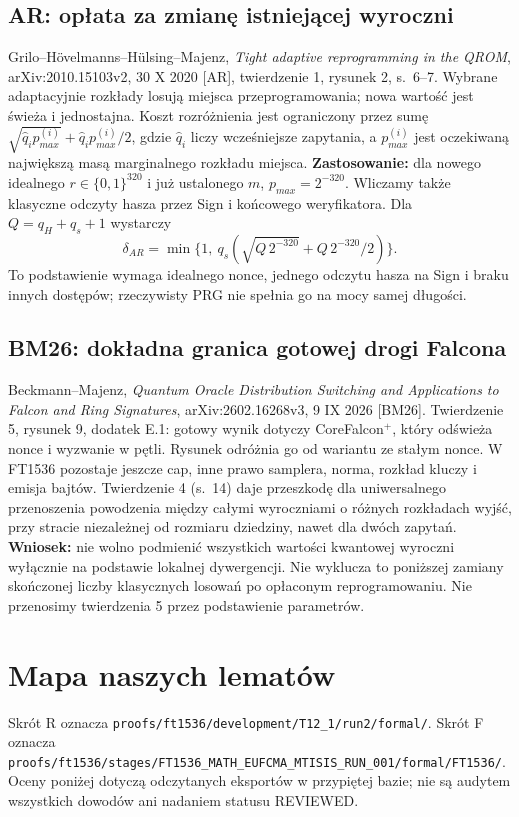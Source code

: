 \documentclass[11pt,a4paper]{article}
\newcommand{\code}[1]{\nolinkurl{#1}}
\begin{document}
\subsection*{AR: opłata za zmianę istniejącej wyroczni}
Grilo--Hövelmanns--Hülsing--Majenz, \emph{Tight adaptive reprogramming
in the QROM}, arXiv:2010.15103v2, 30 X 2020 [AR], twierdzenie 1,
rysunek 2, s.~6--7. Wybrane adaptacyjnie rozkłady losują miejsca
przeprogramowania; nowa wartość jest świeża i jednostajna. Koszt rozróżnienia
jest ograniczony przez sumę
$\sqrt{\widehat q_i p^{(i)}_{max}}+\widehat q_i p^{(i)}_{max}/2$,
gdzie $\widehat q_i$ liczy wcześniejsze zapytania, a $p^{(i)}_{max}$ jest
oczekiwaną największą masą marginalnego rozkładu miejsca.
\textbf{Zastosowanie:} dla nowego idealnego $r\in\{0,1\}^{320}$ i już
ustalonego $m$, $p_{max}=2^{-320}$. Wliczamy także klasyczne odczyty hasza
przez Sign i końcowego weryfikatora. Dla $Q=q_H+q_s+1$ wystarczy
\[
 \delta_{AR}=\min\{1,\ q_s(\sqrt{Q\,2^{-320}}+Q\,2^{-320}/2)\}.
\]
To podstawienie wymaga idealnego nonce, jednego odczytu hasza na Sign
i braku innych dostępów; rzeczywisty PRG nie spełnia go na mocy samej długości.

\subsection*{BM26: dokładna granica gotowej drogi Falcona}
Beckmann--Majenz, \emph{Quantum Oracle Distribution Switching and
Applications to Falcon and Ring Signatures}, arXiv:2602.16268v3,
9 IX 2026 [BM26]. Twierdzenie 5, rysunek 9, dodatek E.1:
gotowy wynik dotyczy CoreFalcon$^+$, który odświeża nonce i wyzwanie w pętli.
Rysunek odróżnia go od wariantu ze stałym nonce. W FT1536 pozostaje jeszcze
cap, inne prawo samplera, norma, rozkład kluczy i emisja bajtów.
Twierdzenie 4 (s.~14) daje przeszkodę dla uniwersalnego przenoszenia
powodzenia między całymi wyroczniami o różnych rozkładach wyjść,
przy stracie niezależnej od rozmiaru dziedziny, nawet dla dwóch zapytań.
\textbf{Wniosek:} nie wolno podmienić wszystkich wartości kwantowej
wyroczni wyłącznie na podstawie lokalnej dywergencji. Nie wyklucza to
poniższej zamiany skończonej liczby klasycznych losowań po opłaconym
reprogramowaniu. Nie przenosimy twierdzenia 5 przez podstawienie parametrów.

\section{Mapa naszych lematów}
Skrót R oznacza \code{proofs/ft1536/development/T12_1/run2/formal/}.
Skrót F oznacza \code{proofs/ft1536/stages/FT1536_MATH_EUFCMA_MTISIS_RUN_001/formal/FT1536/}.
Oceny poniżej dotyczą odczytanych eksportów w przypiętej bazie;
nie są audytem wszystkich dowodów ani nadaniem statusu REVIEWED.
\end{document}
